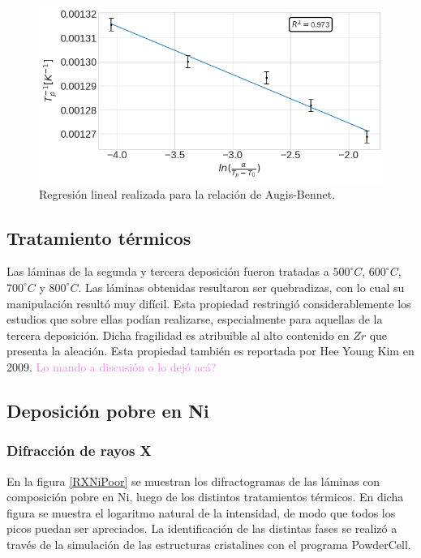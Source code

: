 \documentclass[12pt]{article}
\theoremstyle{definition}
\theoremstyle{remark}
\begin{document}
{ \begin{figure}[H]
 	\centering
	\includegraphics[scale=0.4]{img/Augis_bennet.png}
 	\caption{Regresión lineal realizada para la relación de Augis-Bennet.}
	\label{AugBen}
\end{figure} 

\subsection{Tratamiento térmicos}

Las láminas de la segunda y tercera deposición fueron tratadas a $500 ^\circ C$, $600 ^\circ C$, $700 ^\circ C$ y $800 ^\circ C$. Las láminas obtenidas resultaron ser quebradizas, con lo cual su manipulación resultó muy difícil. 
Esta propiedad restringió considerablemente los estudios que sobre ellas podían realizarse, especialmente para aquellas de la tercera deposición. Dicha fragilidad es atribuible al alto contenido en $Zr$ que presenta la aleación. Esta propiedad también es reportada por Hee Young Kim en 2009\cite{HeeYoungKim2009}. \textcolor{violet}{Lo mando a discusión o lo dejó acá?}


\subsection{Deposición pobre en Ni}
\subsubsection{Difracción de rayos X}
En la figura \ref{RXNiPoor} se muestran los difractogramas de las láminas con composición pobre en Ni, luego de los distintos tratamientos térmicos. En dicha figura se muestra el logaritmo natural de la intensidad, de modo que todos los picos puedan ser apreciados. La identificación de las distintas fases se realizó a través de la simulación de las estructuras cristalines con el programa PowderCell.

}
\end{document}
